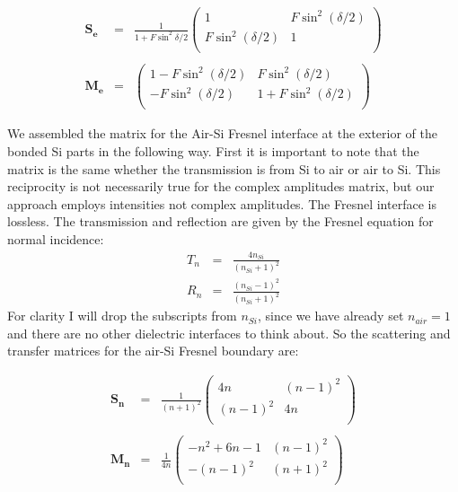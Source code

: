 \documentclass[osajnl,preprint,showpacs,superscriptaddress,12pt]{revtex4-1} %
\begin{document}
\begin{eqnarray}
\boldsymbol{S_e}&=&\frac{1}{1+F\sin^2{\delta/2}} \left(
\begin{array}{cc}
1 & F \sin ^2(\delta/2) \\
F \sin ^2(\delta/2) & 1 \\
\end{array}
\right) \nonumber \\
\nonumber \\
\boldsymbol{M_e}&=&\left(
\begin{array}{cc}
 1-F \sin ^2(\delta/2) & F \sin ^2(\delta/2) \\
 -F \sin ^2(\delta/2) & 1+F \sin ^2(\delta/2) \\
\end{array}
\right)
\label{eqn:EtalonMatrix}
\end{eqnarray}

We assembled the matrix for the Air-Si Fresnel interface at the exterior of the bonded Si parts in the following way.  First it is important to note that the matrix is the same whether the transmission is from Si to air or air to Si.  This reciprocity is not necessarily true for the complex amplitudes matrix, but our approach employs intensities not complex amplitudes.  The Fresnel interface is lossless.  The transmission and reflection are given by the Fresnel equation for normal incidence:
\begin{eqnarray}
T_n&=&\frac{4n_{Si}}{(n_{Si}+1)^2} \\
R_n&=&\frac{(n_{Si}-1)^2}{(n_{Si}+1)^2} \label{eq:FresnelTrans}
\end{eqnarray}
For clarity I will drop the subscripts from $n_{Si}$, since we have already set $n_{air}=1$ and there are no other dielectric interfaces to think about.  So the scattering and transfer matrices for the air-Si Fresnel boundary are:

\begin{eqnarray}
\boldsymbol{S_n}&=&\frac{1}{(n+1)^2} \left(
\begin{array}{cc}
4n & (n-1)^2 \\
(n-1)^2 & 4n \\
\end{array}
\right)  \nonumber \\
\nonumber \\
\boldsymbol{M_n}&=&\frac{1}{4n}\left(
\begin{array}{cc}
 -n^2+6  n-1 & ( n-1)^2 \\
 -( n-1)^2 & ( n+1)^2 \\
\end{array}
\right)
\label{eqn:SiAirMatrix}
\end{eqnarray}
\end{document}
